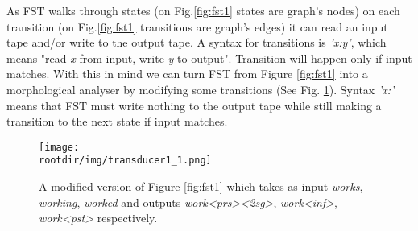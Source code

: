 \par As FST walks through states (on Fig.\ref{fig:fst1} states are graph's nodes) on each transition (on Fig.\ref{fig:fst1} transitions are graph's edges) it can read an input tape and/or write to the output tape. A syntax for transitions is \textit{'x:y'}, which means "read \textit{x} from input, write \textit{y} to output". Transition will happen only if input matches. With this in mind we can turn FST from Figure \ref{fig:fst1} into a morphological analyser by modifying some transitions (See Fig. \ref{fig:fst1_1}). Syntax \textit{'x:'} means that FST must write nothing to the output tape while still making a transition to the next state if input matches.
\begin{figure}[!ht]
    \centering
    \texttt{[image: \\rootdir/img/transducer1\_1.png]}
    \caption{A modified version of Figure \ref{fig:fst1} which takes as input \textit{works}, \textit{working}, \textit{worked} and outputs \textit{work<prs><2sg>}, \textit{work<inf>}, \textit{work<pst>} respectively.}
    \label{fig:fst1_1}
\end{figure}

